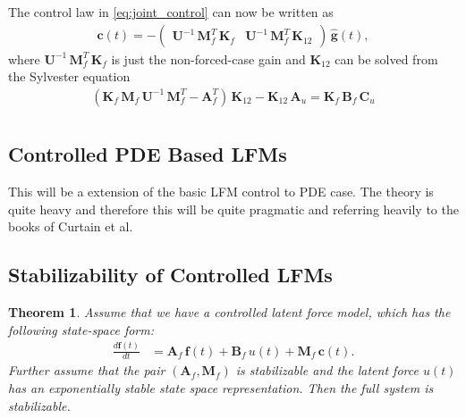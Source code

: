 \documentclass[journal]{IEEEtran}
\newtheorem{theorem}{Theorem}[section]
\newcommand{\simo}[1]{{\color{red}#1}}
\begin{document}
The control law in \eqref{eq:joint_control} can now be written as
%
\begin{equation}
\begin{split}
  \mathbf{c}(t) = - \begin{pmatrix}
    \mathbf{U}^{-1} \, \mathbf{M}_f^T \, \mathbf{K}_{f} &
    \mathbf{U}^{-1} \, \mathbf{M}_f^T \, \mathbf{K}_{12}
  \end{pmatrix} \, \hat{\mathbf{g}}(t),
\end{split}
\label{eq:joint_control2}
\end{equation}
%
where $\mathbf{U}^{-1} \, \mathbf{M}_f^T \, \mathbf{K}_{f}$ is just the non-forced-case gain and $\mathbf{K}_{12}$ can be solved from the Sylvester equation
%
\begin{equation}
\begin{split}
  \left( \mathbf{K}_{f} \, \mathbf{M}_f \, \mathbf{U}^{-1} \, \mathbf{M}_f^T 
         - \mathbf{A}_f^T \right) \, \mathbf{K}_{12}  - \mathbf{K}_{12} \, \mathbf{A}_u
    = \mathbf{K}_{f} \, \mathbf{B}_f \, \mathbf{C}_u \\
\end{split}
\end{equation}


\subsection{Controlled PDE Based LFMs}
%
\simo{This will be a extension of the basic LFM control to PDE case. The theory is quite heavy and therefore this will be quite pragmatic and referring heavily to the books of Curtain et al.}

\subsection{Stabilizability of Controlled LFMs}
%
\begin{theorem}
Assume that we have a controlled latent force model, which has the following state-space form:
\begin{equation}
\begin{split}
  \frac{d\mathbf{f}(t)}{dt}
  &= \mathbf{A}_f \, \mathbf{f}(t) + \mathbf{B}_f \, u(t) + \mathbf{M}_f \, \mathbf{c}(t).
\end{split}
\end{equation}
%
Further assume that the pair $(\mathbf{A}_f,\mathbf{M}_f)$ is stabilizable and the latent force $u(t)$ has an exponentially stable state space representation. Then the full system is \emph{stabilizable}.
\end{theorem}
\end{document}
